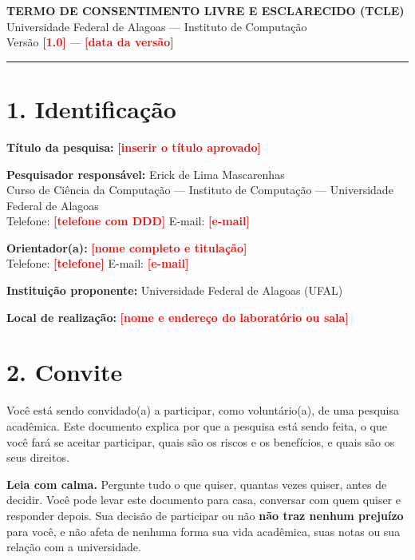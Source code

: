 \documentclass[12pt,a4paper]{article}
\newcommand{\pre}[1]{\textcolor{red}{\textbf{[#1]}}}
\begin{document}
\begin{center}
{\large\bfseries TERMO DE CONSENTIMENTO LIVRE E ESCLARECIDO (TCLE)}\\[4pt]
{\footnotesize Universidade Federal de Alagoas --- Instituto de Computação}\\[2pt]
{\footnotesize Versão \pre{1.0} --- \pre{data da versão}}
\end{center}

\vspace{4pt}
\hrule
\vspace{10pt}

\section*{1. Identificação}

\noindent\textbf{Título da pesquisa:} \pre{inserir o título aprovado}

\noindent\textbf{Pesquisador responsável:} Erick de Lima Mascarenhas\\
Curso de Ciência da Computação --- Instituto de Computação --- Universidade
Federal de Alagoas\\
Telefone: \pre{telefone com DDD} \quad E-mail: \pre{e-mail}

\noindent\textbf{Orientador(a):} \pre{nome completo e titulação}\\
Telefone: \pre{telefone} \quad E-mail: \pre{e-mail}

\noindent\textbf{Instituição proponente:} Universidade Federal de Alagoas (UFAL)

\noindent\textbf{Local de realização:} \pre{nome e endereço do laboratório ou sala}

\section*{2. Convite}

Você está sendo convidado(a) a participar, como voluntário(a), de uma pesquisa
acadêmica. Este documento explica por que a pesquisa está sendo feita, o que
você fará se aceitar participar, quais são os riscos e os benefícios, e quais
são os seus direitos.

\textbf{Leia com calma.} Pergunte tudo o que quiser, quantas vezes quiser, antes
de decidir. Você pode levar este documento para casa, conversar com quem quiser
e responder depois. Sua decisão de participar ou não \textbf{não traz nenhum
prejuízo} para você, e não afeta de nenhuma forma sua vida acadêmica, suas notas
ou sua relação com a universidade.
\end{document}
